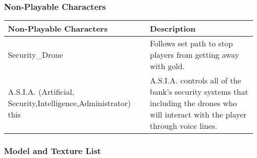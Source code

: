 \documentclass[10pt]{report}
\begin{document}
\subsubsection{Non-Playable Characters}

\begin{center}
    \begin{tabular}{| p{.45\linewidth} | p{.45\linewidth} |}
        \hline    
        Non-Playable Characters &   Description  \\ \hline
        Security\_Drone &    Follows set path to stop players from getting away with gold.  \\ \hline
        A.S.I.A. (Artificial, Security,Intelligence,Administrator) this &   A.S.I.A. controls all of the bank’s security systems that including the drones who will interact with the player through voice lines.  \\
        \hline
    \end{tabular}
\end{center}

\subsubsection{Model and Texture List}
\end{document}
